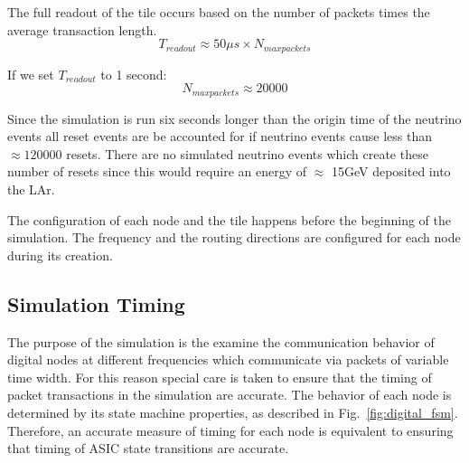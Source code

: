 The full readout of the tile occurs based on the number of packets times the average transaction length.
$$
T_{readout} \approx 50 \mu s \times N_{max packets}
$$

If we set $T_{readout}$ to 1 second:
$$
N_{max packets} \approx  20000
$$

Since the simulation is run six seconds longer than the origin time of the neutrino events all reset events are be accounted for if neutrino events cause less than $\approx 120000$ resets.
There are no simulated neutrino events which create these number of resets since this would require an energy of $\approx$ 15\unit{GeV} deposited into the LAr.

The configuration of each node and the tile happens before the beginning of the simulation.
The frequency and the routing directions are configured for each node during its creation.

\subsection{Simulation Timing}

The purpose of the simulation is the examine the communication behavior of digital nodes at different frequencies which communicate via packets of variable time width.
For this reason special care is taken to ensure that the timing of packet transactions in the simulation are accurate.
The behavior of each node is determined by its state machine properties, as described in Fig.~\ref{fig:digital_fsm}.
Therefore, an accurate measure of timing for each node is equivalent to ensuring that timing of ASIC state transitions are accurate.

